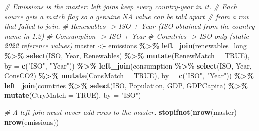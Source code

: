 \documentclass[
]{article}
\newenvironment{Shaded}{\begin{snugshade}}{\end{snugshade}}
\newcommand{\AttributeTok}[1]{\textcolor[rgb]{0.13,0.29,0.53}{#1}}
\newcommand{\CommentTok}[1]{\textcolor[rgb]{0.56,0.35,0.01}{\textit{#1}}}
\newcommand{\ConstantTok}[1]{\textcolor[rgb]{0.56,0.35,0.01}{#1}}
\newcommand{\FunctionTok}[1]{\textcolor[rgb]{0.13,0.29,0.53}{\textbf{#1}}}
\newcommand{\NormalTok}[1]{#1}
\newcommand{\OtherTok}[1]{\textcolor[rgb]{0.56,0.35,0.01}{#1}}
\newcommand{\SpecialCharTok}[1]{\textcolor[rgb]{0.81,0.36,0.00}{\textbf{#1}}}
\newcommand{\StringTok}[1]{\textcolor[rgb]{0.31,0.60,0.02}{#1}}
\begin{document}
\begin{Shaded}
\begin{Highlighting}[]
\CommentTok{\# Emissions is the master: left joins keep every country{-}year in it.}
\CommentTok{\# Each source gets a match flag so a genuine NA value can be told apart}
\CommentTok{\# from a row that failed to join.}
\CommentTok{\#   Renewables  {-}\textgreater{} ISO + Year (ISO obtained from the country name in 1.2)}
\CommentTok{\#   Consumption {-}\textgreater{} ISO + Year}
\CommentTok{\#   Countries   {-}\textgreater{} ISO only (static 2022 reference values)}
\NormalTok{master }\OtherTok{\textless{}{-}}\NormalTok{ emissions }\SpecialCharTok{\%\textgreater{}\%}
  \FunctionTok{left\_join}\NormalTok{(renewables\_long }\SpecialCharTok{\%\textgreater{}\%}
              \FunctionTok{select}\NormalTok{(ISO, Year, Renewables) }\SpecialCharTok{\%\textgreater{}\%}
              \FunctionTok{mutate}\NormalTok{(}\AttributeTok{RenewMatch =} \ConstantTok{TRUE}\NormalTok{),}
            \AttributeTok{by =} \FunctionTok{c}\NormalTok{(}\StringTok{"ISO"}\NormalTok{, }\StringTok{"Year"}\NormalTok{)) }\SpecialCharTok{\%\textgreater{}\%}
  \FunctionTok{left\_join}\NormalTok{(consumption }\SpecialCharTok{\%\textgreater{}\%}
              \FunctionTok{select}\NormalTok{(ISO, Year, ConsCO2) }\SpecialCharTok{\%\textgreater{}\%}
              \FunctionTok{mutate}\NormalTok{(}\AttributeTok{ConsMatch =} \ConstantTok{TRUE}\NormalTok{),}
            \AttributeTok{by =} \FunctionTok{c}\NormalTok{(}\StringTok{"ISO"}\NormalTok{, }\StringTok{"Year"}\NormalTok{)) }\SpecialCharTok{\%\textgreater{}\%}
  \FunctionTok{left\_join}\NormalTok{(countries }\SpecialCharTok{\%\textgreater{}\%}
              \FunctionTok{select}\NormalTok{(ISO, Population, GDP, GDPCapita) }\SpecialCharTok{\%\textgreater{}\%}
              \FunctionTok{mutate}\NormalTok{(}\AttributeTok{CtryMatch =} \ConstantTok{TRUE}\NormalTok{),}
            \AttributeTok{by =} \StringTok{"ISO"}\NormalTok{)}

\CommentTok{\# A left join must never add rows to the master.}
\FunctionTok{stopifnot}\NormalTok{(}\FunctionTok{nrow}\NormalTok{(master) }\SpecialCharTok{==} \FunctionTok{nrow}\NormalTok{(emissions))}


\end{Highlighting}
\end{Shaded}
\end{document}
